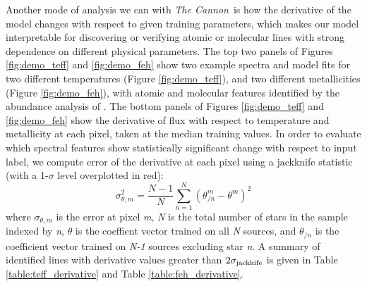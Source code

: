 \documentclass[twocolumn]{aastex62}
\newcommand{\thecannon}{\textsl{The Cannon}}
\begin{document}
Another mode of analysis we can \color{red}{\bf utilize }\color{black} with \thecannon\ is how the derivative of the model changes with respect to given training parameters, which makes our model interpretable for discovering or verifying atomic or molecular lines with strong dependence on different physical parameters. The top two panels of Figures \ref{fig:demo_teff} and \ref{fig:demo_feh} show two example spectra and model fits for two different temperatures (Figure \ref{fig:demo_teff}), and two different metallicities (Figure \ref{fig:demo_feh}), with atomic and molecular features identified by the abundance analysis of \citet{Souto:2017}. The bottom panels of Figures \ref{fig:demo_teff} and \ref{fig:demo_feh} show the derivative of flux with respect to temperature and metallicity at each pixel, taken at the median training values. In order to evaluate which spectral features show statistically significant change with respect to input label, we compute \color{red}{\bf the }\color{black} error of the derivative at each pixel using a jackknife statistic (with a 1-$\sigma$ level overplotted in red):
\begin{equation}
	\sigma_{\theta,m}^2 = \frac{N-1}{N} \sum^N_{n=1} (\theta_{/n}^m - \theta^m)^2 
\end{equation}
where $\sigma_{\theta,m}$ is the error at pixel \emph{m}, \emph{N} is the total number of stars in the sample indexed by \emph{n}, $\theta$ is the coeffient vector trained on all \emph{N} sources, and $\theta_{/n}$ is the coefficient vector trained on \emph{N-1} sources excluding star \emph{n}. A summary of identified lines with derivative values greater than $2\sigma_{\rm jackkife}$ is given in Table \ref{table:teff_derivative} and Table \ref{table:feh_derivative}.
\end{document}
